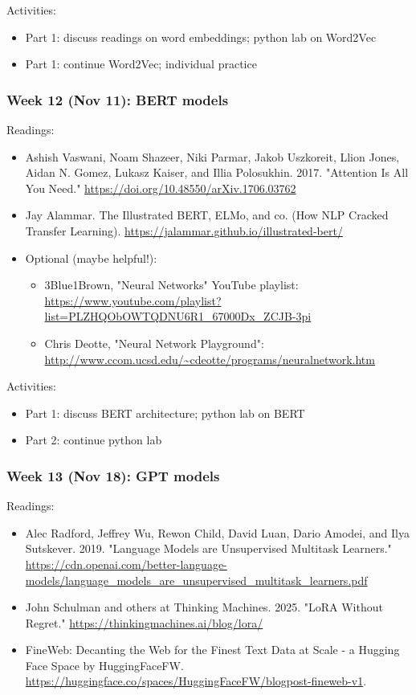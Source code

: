 \documentclass[12pt]{article}
\begin{document}
Activities:
\begin{itemize}
\item Part 1: discuss readings on word embeddings; python lab on Word2Vec
\item Part 1: continue Word2Vec; individual practice
\end{itemize}

\subsubsection*{Week 12 (Nov 11): BERT models}
\label{sec:org2c8dfc6}
Readings:
\begin{itemize}
\item Ashish Vaswani, Noam Shazeer, Niki Parmar, Jakob Uszkoreit, Llion
Jones, Aidan N. Gomez, Lukasz Kaiser, and Illia Polosukhin. 2017.
"Attention Is All You Need."
\url{https://doi.org/10.48550/arXiv.1706.03762}
\item Jay Alammar. The Illustrated BERT, ELMo, and co. (How NLP Cracked
Transfer Learning). \url{https://jalammar.github.io/illustrated-bert/}
\item Optional (maybe helpful!):
\begin{itemize}
\item 3Blue1Brown, "Neural Networks" YouTube playlist:
\url{https://www.youtube.com/playlist?list=PLZHQObOWTQDNU6R1\_67000Dx\_ZCJB-3pi}
\item Chris Deotte, "Neural Network Playground":
\url{http://www.ccom.ucsd.edu/\~cdeotte/programs/neuralnetwork.htm}
\end{itemize}
\end{itemize}

Activities:
\begin{itemize}
\item Part 1: discuss BERT architecture; python lab on BERT
\item Part 2: continue python lab
\end{itemize}

\subsubsection*{Week 13 (Nov 18): GPT models}
\label{sec:org2c01108}
Readings:
\begin{itemize}
\item Alec Radford, Jeffrey Wu, Rewon Child, David Luan, Dario Amodei, and
Ilya Sutskever. 2019. "Language Models are Unsupervised Multitask
Learners." \url{https://cdn.openai.com/better-language-models/language\_models\_are\_unsupervised\_multitask\_learners.pdf}
\item John Schulman and others at Thinking Machines. 2025. "LoRA Without
Regret." \url{https://thinkingmachines.ai/blog/lora/}
\item FineWeb: Decanting the Web for the Finest Text Data at Scale - a
Hugging Face Space by HuggingFaceFW.
\url{https://huggingface.co/spaces/HuggingFaceFW/blogpost-fineweb-v1}.
\end{itemize}
\end{document}
